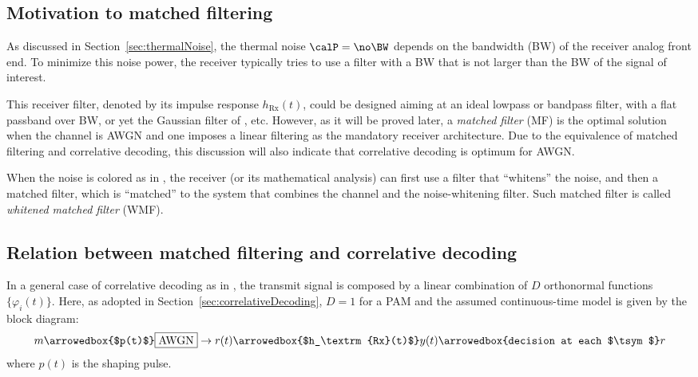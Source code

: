 
\subsection{Motivation to matched filtering}

As discussed in Section~\ref{sec:thermalNoise}, the thermal noise $\calP=\no \BW$ depends
on the bandwidth (BW) of the receiver analog front end. To minimize this noise power, the receiver typically tries to use a filter with a BW that is not larger than the BW of the signal of interest.

This receiver filter, denoted by its impulse response $h_{\textrm{Rx}}(t)$, could be designed aiming at an ideal lowpass or bandpass filter, with a flat passband over BW, or yet the Gaussian filter of , etc. However, as it will be proved later, a \emph{matched filter} (MF) is the optimal solution when the channel is AWGN and one imposes a linear filtering as the mandatory receiver architecture. Due to the equivalence of matched filtering and correlative decoding, this
discussion will also indicate that correlative decoding is optimum for AWGN.

When the noise is colored as in , the receiver 
(or its mathematical analysis) can first use a filter that ``whitens'' 
the noise, and then a matched filter, which is ``matched'' to the
system that combines the channel and the noise-whitening
filter. Such matched filter is called 
\emph{whitened matched filter} (WMF).

\subsection{Relation between matched filtering and correlative decoding}

In a general case of correlative decoding as in , the transmit signal is composed by a linear  combination of $D$ orthonormal functions 
$\{ \varphi_i(t) \}$. Here, as adopted in Section~\ref{sec:correlativeDecoding}, 
$D=1$ for a PAM and the assumed continuous-time model is given by the block diagram:
\begin{align*}
m \arrowedbox{$p(t)$} \fbox{AWGN} \rightarrow r(t) \arrowedbox{$h_\textrm{Rx}(t)$} y(t) \arrowedbox{decision at each $\tsym$}  r
\end{align*}
where $p(t)$ is the shaping pulse.

